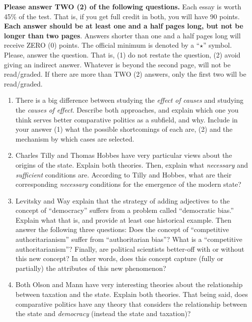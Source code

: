\documentclass{article}
\begin{document}
{\bf Please answer TWO (2) of the following questions.} Each essay is worth 45\% of the test. That is, if you get full credit in both, you will have 90 points. {\bf Each answer should be at least one and a half pages long, but not be longer than two pages}. Answers shorter than one and a half pages long will receive ZERO (0) points. The official minimum is denoted by a ``$\star$'' symbol. Please, answer the question. That is, (1) do not restate the question, (2) avoid giving an indirect answer. Whatever is beyond the second page, will not be read/graded. If there are more than TWO (2) answers, only the first two will be read/graded.


\begin{enumerate}
    \item There is a big difference between studying the \emph{effect of causes} and studying the \emph{causes of effect}. Describe both approaches, and explain which one you think serves better comparative politics as a subfield, and why. Include in your answer (1) what the possible shortcomings of each are, (2) and the mechanism by which cases are selected.
    
    \item Charles Tilly and Thomas Hobbes have very particular views about the origins of the state. Explain both theories. Then, explain what \emph{necessary} and \emph{sufficient} conditions are. According to Tilly and Hobbes, what are their corresponding \emph{necessary} conditions for the emergence of the modern state?
    
    
    \item Levitsky and Way explain that the strategy of adding adjectives to the concept of ``democracy'' suffers from a problem called ``democratic bias.'' Explain what that is, and provide at least one historical example. Then answer the following three questions: Does the concept of ``competitive authoritarianism'' suffer from ``authoritarian bias''?  What is a ``competitive authoritarianism''? Finally, are political scientists  better-off with or without this new concept? In other words, does this concept capture (fully or partially) the attributes of this new phenomenon?
    
    \item Both Olson and Mann have very interesting theories about the relationship between taxation and the state. Explain both theories. That being said, does comparative politics have any theory that considers the relationship between the state and \emph{democracy} (instead the state and taxation)?

\end{enumerate}
\end{document}
